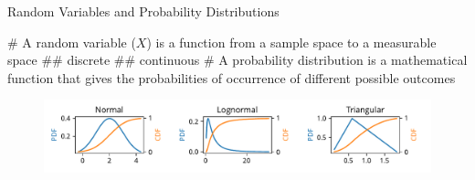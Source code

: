 \documentclass[12pt, aspectratio=149]{beamer}
\theoremstyle{plain}
\begin{document}
\begin{frame}[fragile]{Random Variables and Probability Distributions}

	\begin{easylist}[itemize]
		# A random variable ($X$) is a function from a sample space to a measurable space 
		## discrete
		## continuous
		# A probability distribution is a mathematical function that gives the probabilities of occurrence of different possible outcomes
	\end{easylist}

	\begin{figure}
		\centering
		\includegraphics[width=0.99\linewidth]{figures/pdfs_cdfs}
	\end{figure}

\end{frame}
\end{document}
